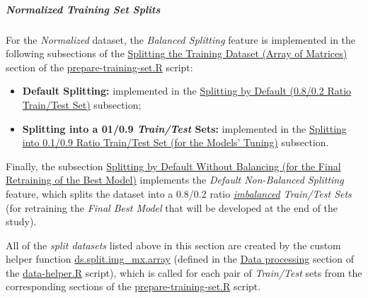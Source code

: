 \documentclass[
]{report}
\providecommand{\tightlist}{%
  \setlength{\itemsep}{0pt}\setlength{\parskip}{0pt}}
\begin{document}
\normalsize

\newpage

\subparagraph{Normalized Training Set Splits}\label{normalized-training-set-splits}

\hfill\break

For the \emph{Normalized} dataset, the \emph{Balanced Splitting} feature is implemented in the following subsections of the \href{https://github.com/AzKurban-edX-DS/edx.capstone.choose-your-own/blob/main/r/support-scripts/prepare-training-set.R\#L71-L194}{Splitting the Training Dataset (Array of Matrices)} section of the \href{https://github.com/AzKurban-edX-DS/edx.capstone.choose-your-own/blob/main/r/support-scripts/prepare-training-set.R}{prepare-training-set.R} script:

\begin{itemize}
\tightlist
\item
  \textbf{Default Splitting:} implemented in the \href{https://github.com/AzKurban-edX-DS/edx.capstone.choose-your-own/blob/main/r/support-scripts/prepare-training-set.R\#L72-L112}{Splitting by Default (0.8/0.2 Ratio Train/Test Set)} subsection;
\item
  \textbf{Splitting into a 01/0.9 \emph{Train/Test} Sets:} implemented in the \href{https://github.com/AzKurban-edX-DS/edx.capstone.choose-your-own/blob/main/r/support-scripts/prepare-training-set.R\#L113-L151}{Splitting into 0.1/0.9 Ratio Train/Test Set (for the Models' Tuning)} subsection.
\end{itemize}

Finally, the subsection \href{https://github.com/AzKurban-edX-DS/edx.capstone.choose-your-own/blob/main/r/support-scripts/prepare-training-set.R\#L152-L193}{Splitting by Default Without Balancing (for the Final Retraining of the Best Model)} implements the \emph{Default Non-Balanced Splitting} feature, which splits the dataset into a 0.8/0.2 ratio \emph{\underline{imbalanced} Train/Test Sets} (for retraining the \emph{Final Best Model} that will be developed at the end of the study).

\begin{noteblock}
All of the \emph{split datasets} listed above in this section are created by the custom helper function \href{https://github.com/AzKurban-edX-DS/edx.capstone.choose-your-own/blob/main/r/support-functions/data-helper.R\#L520}{ds.split.img\_mx.array} (defined in the \href{https://github.com/AzKurban-edX-DS/edx.capstone.choose-your-own/blob/main/r/support-functions/data-helper.R\#L519-L1080}{Data processing} section of the \href{https://github.com/AzKurban-edX-DS/edx.capstone.choose-your-own/blob/main/r/support-functions/data-helper.R\#L520}{data-helper.R} script), which is called for each pair of \emph{Train/Test} sets from the corresponding sections of the \href{https://github.com/AzKurban-edX-DS/edx.capstone.choose-your-own/blob/main/r/support-scripts/prepare-training-set.R}{prepare-training-set.R} script.

\end{noteblock}
\end{document}
